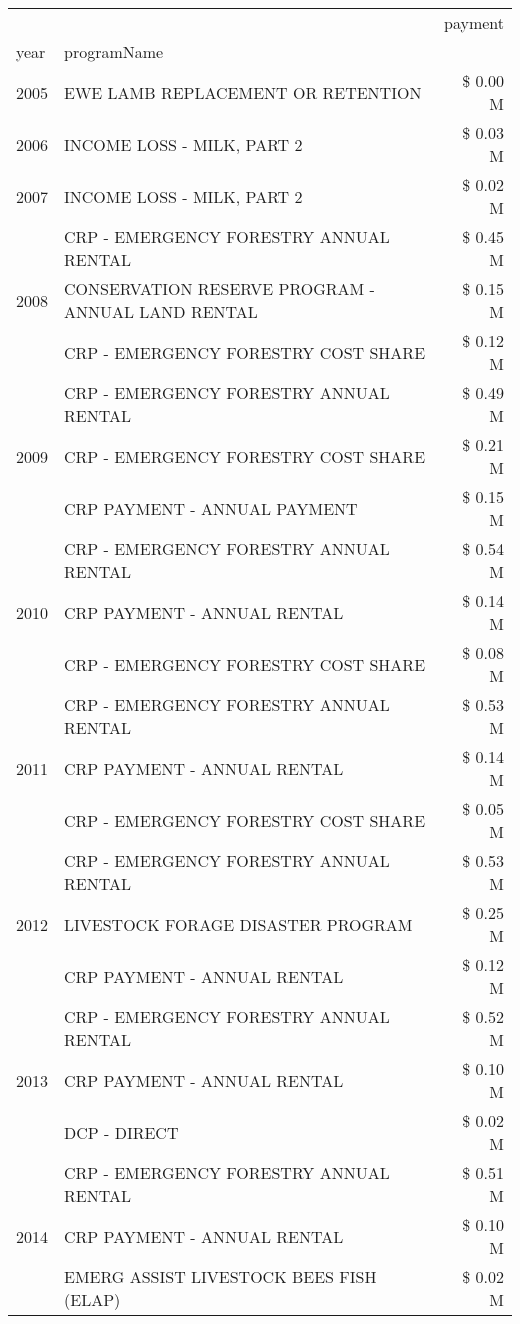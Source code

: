 \begin{tabular}{llr}
\toprule
 &  & payment \\
year & programName &  \\
\midrule
2005 & EWE LAMB REPLACEMENT OR RETENTION & \$ 0.00 M \\
\cline{1-3}
2006 & INCOME LOSS - MILK, PART 2 & \$ 0.03 M \\
\cline{1-3}
2007 & INCOME LOSS - MILK, PART 2 & \$ 0.02 M \\
\cline{1-3}
\multirow[t]{3}{*}{2008} & CRP - EMERGENCY FORESTRY ANNUAL RENTAL & \$ 0.45 M \\
 & CONSERVATION RESERVE PROGRAM - ANNUAL LAND RENTAL & \$ 0.15 M \\
 & CRP - EMERGENCY FORESTRY COST SHARE & \$ 0.12 M \\
\cline{1-3}
\multirow[t]{3}{*}{2009} & CRP - EMERGENCY FORESTRY ANNUAL RENTAL & \$ 0.49 M \\
 & CRP - EMERGENCY FORESTRY COST SHARE & \$ 0.21 M \\
 & CRP PAYMENT - ANNUAL PAYMENT & \$ 0.15 M \\
\cline{1-3}
\multirow[t]{3}{*}{2010} & CRP - EMERGENCY FORESTRY ANNUAL RENTAL & \$ 0.54 M \\
 & CRP PAYMENT - ANNUAL RENTAL & \$ 0.14 M \\
 & CRP - EMERGENCY FORESTRY COST SHARE & \$ 0.08 M \\
\cline{1-3}
\multirow[t]{3}{*}{2011} & CRP - EMERGENCY FORESTRY ANNUAL RENTAL & \$ 0.53 M \\
 & CRP PAYMENT - ANNUAL RENTAL & \$ 0.14 M \\
 & CRP - EMERGENCY FORESTRY COST SHARE & \$ 0.05 M \\
\cline{1-3}
\multirow[t]{3}{*}{2012} & CRP - EMERGENCY FORESTRY ANNUAL RENTAL & \$ 0.53 M \\
 & LIVESTOCK FORAGE DISASTER PROGRAM & \$ 0.25 M \\
 & CRP PAYMENT - ANNUAL RENTAL & \$ 0.12 M \\
\cline{1-3}
\multirow[t]{3}{*}{2013} & CRP - EMERGENCY FORESTRY ANNUAL RENTAL & \$ 0.52 M \\
 & CRP PAYMENT - ANNUAL RENTAL & \$ 0.10 M \\
 & DCP - DIRECT & \$ 0.02 M \\
\cline{1-3}
\multirow[t]{3}{*}{2014} & CRP - EMERGENCY FORESTRY ANNUAL RENTAL & \$ 0.51 M \\
 & CRP PAYMENT - ANNUAL RENTAL & \$ 0.10 M \\
 & EMERG ASSIST LIVESTOCK BEES FISH (ELAP) & \$ 0.02 M \\

\end{tabular}
